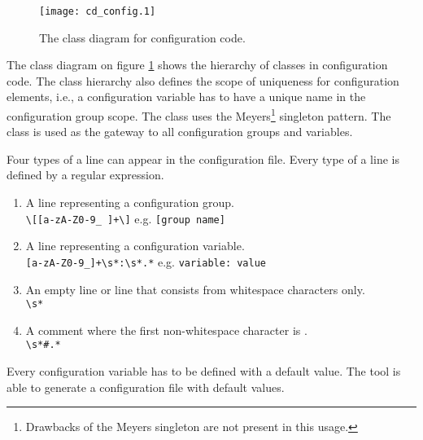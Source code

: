 \begin{figure}[h!]
\caption{The class diagram for configuration code.}
\label{cd-configuration}
\vspace{0.5cm}
\centering
\texttt{[image: cd\_config.1]}
\end{figure}

The class diagram on figure \ref{cd-configuration} shows the hierarchy of classes in configuration code. The class hierarchy also defines the scope of uniqueness for configuration elements, i.e., a configuration variable has to have a unique name in the configuration group scope. The  class uses the Meyers\footnote{Drawbacks of the Meyers singleton are not present in this usage.} singleton pattern. The class is used as the gateway to all configuration groups and variables.

Four types of a line can appear in the configuration file. Every type of a line is defined by a regular expression.

\begin{enumerate}
\item{A line representing a configuration group.\\ \verb$\[[a-zA-Z0-9_ ]+\]$ e.g. \verb$[group name]$}  
\item{A line representing a configuration variable. \\ \verb$[a-zA-Z0-9_]+\s*:\s*.*$ e.g. \verb$variable: value$}
\item{An empty line or line that consists from whitespace characters only. \\ \verb$\s*$}
\item{A comment where the first non-whitespace character is \code{\#}. \\ \verb$\s*#.*$}
\end{enumerate}

Every configuration variable has to be defined with a default value. The tool is able to generate a configuration file with default values.